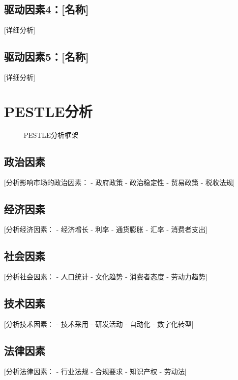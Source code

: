 \documentclass[11pt,letterpaper]{report}
\begin{document}
{\subsection{驱动因素4：[名称]}
[详细分析]

\subsection{驱动因素5：[名称]}
[详细分析]

\section{PESTLE分析}


\begin{figure}[htbp]
\centering
\caption{PESTLE分析框架}
\label{fig:pestle}
\end{figure}

\subsection{政治因素}
[分析影响市场的政治因素：
- 政府政策
- 政治稳定性
- 贸易政策
- 税收法规]

\subsection{经济因素}
[分析经济因素：
- 经济增长
- 利率
- 通货膨胀
- 汇率
- 消费者支出]

\subsection{社会因素}
[分析社会因素：
- 人口统计
- 文化趋势
- 消费者态度
- 劳动力趋势]

\subsection{技术因素}
[分析技术因素：
- 技术采用
- 研发活动
- 自动化
- 数字化转型]

\subsection{法律因素}
[分析法律因素：
- 行业法规
- 合规要求
- 知识产权
- 劳动法]

}
\end{document}
